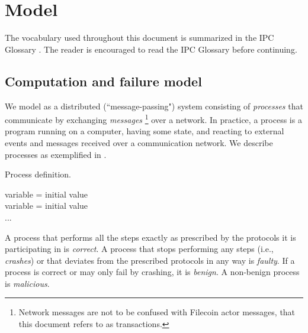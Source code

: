 \section{Model}
\label{sec:model}

The vocabulary used throughout this document is summarized in the IPC Glossary \cite{glossary}.
The reader is encouraged to read the IPC Glossary before continuing.


\subsection{Computation and failure model}

We model \ipc as a distributed (``message-passing") system consisting of \emph{processes} that communicate by exchanging \emph{messages}%
\footnote{Network messages are not to be confused with Filecoin actor messages, that this document refers to as transactions.}
over a network. 
In practice, a process is a program running on a computer, having some state, and reacting to external events and messages received over a communication network.
We describe processes as exemplified in .

\begin{algorithm}[H]
\footnotesize
\caption{Process definition.}\label{alg:process-definition}
  \DontPrintSemicolon
  variable = initial value\\
  variable = initial value\\
  ...\\
\end{algorithm}

A process that performs all the steps exactly as prescribed by the protocols it is participating in is \emph{correct}.
A process that stops performing any steps (i.e., \emph{crashes}) or that deviates from the prescribed protocols in any way is \emph{faulty}.
If a process is correct or may only fail by crashing, it is \emph{benign}.
A non-benign process is \emph{malicious}.

